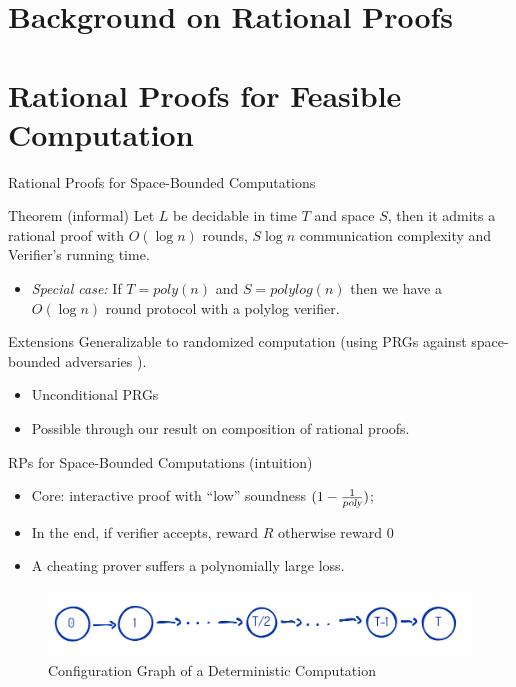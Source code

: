 \section{Background on Rational Proofs}


\section{Rational Proofs for Feasible Computation}

\begin{frame}{Rational Proofs for Space-Bounded Computations}
\begin{block}{Theorem (informal)}
	Let $L$ be decidable in time $T$ and space $S$\pause, then it admits a rational proof with $O(\log n)$ rounds, $S \log n$ communication complexity and Verifier's running time.
\end{block}
\pause
\begin{itemize}
	\item \textit{Special case:} If $T=poly(n)$ and $S=polylog(n)$ then we have a $O(\log n)$ round protocol with a polylog verifier.
\end{itemize}
\pause
\bigskip
\begin{block}{Extensions}
	 Generalizable to randomized computation (using PRGs against space-bounded adversaries \cite{nisan1992pseudorandom}).
	 \pause
\begin{itemize}[<+->]
	\item Unconditional PRGs
	\item Possible through our  result on composition of rational proofs.
\end{itemize}
\end{block}
\end{frame}

\begin{frame}{RPs for Space-Bounded Computations (intuition)}
\begin{itemize}
	\item Core: interactive proof with ``low'' soundness $(1-\frac{1}{{\textsl{poly}}})$;\pause
	\item In the end, if verifier accepts, reward $R$ otherwise reward $0$\pause
	\item A cheating prover suffers a polynomially large loss.
\end{itemize}
\medskip
\begin{figure}
	\pause
	\includegraphics[scale=0.3]{pics/space-protocol.png}
	\caption{Configuration Graph of a Deterministic  Computation}
\end{figure}
\end{frame}


